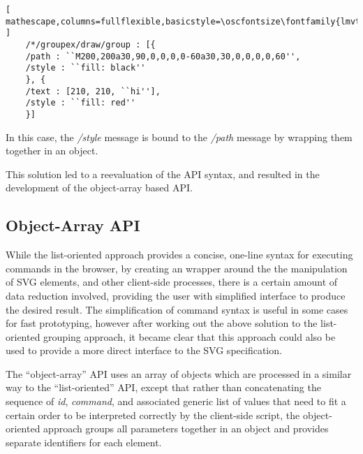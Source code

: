 \begin{lstlisting}[ mathescape,columns=fullflexible,basicstyle=\oscfontsize\fontfamily{lmvtt}\selectfont ]
    /*/groupex/draw/group : [{
	/path : ``M200,200a30,90,0,0,0,0-60a30,30,0,0,0,0,60'',
	/style : ``fill: black''
    }, {
	/text : [210, 210, ``hi''],
	/style : ``fill: red''
    }]
\end{lstlisting}

\noindent
In this case, the \textit{/style} message is bound to the \textit{/path} message by wrapping them together in an object. 

This solution led to a reevaluation of the \drawsocket API syntax, and resulted in the development of the object-array based API.

\subsection{Object-Array API}\label{sec:objstyle}
While the list-oriented approach provides a concise, one-line syntax for executing \drawsocket commands in the browser, by creating an wrapper around the the manipulation of SVG elements, and other client-side processes, there is a certain amount of data reduction involved, providing the user with simplified interface to produce the desired result. 
The simplification of command syntax is useful in some cases for fast prototyping, however after working out the above solution to the list-oriented grouping approach, it became clear that this approach could also be used to provide a more direct interface to the SVG specification. 

The ``object-array'' API uses an array of objects which are processed in a similar way to the ``list-oriented'' API, except that rather than concatenating the sequence of \textit{id}, \textit{command}, and associated generic list of values that need to fit a certain order to be interpreted correctly by the client-side script, the object-oriented approach groups all parameters together in an object and provides separate identifiers for each element. 

